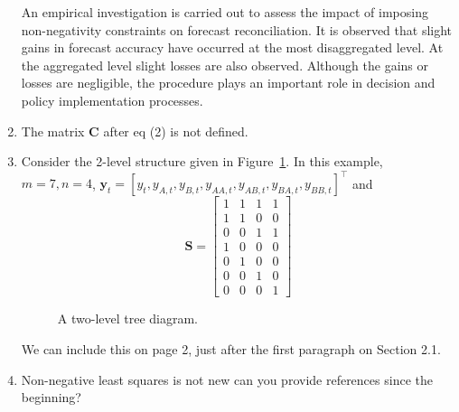 \documentclass[10pt,a4paper]{article}
\begin{document}
\begin{enumerate}
{	An empirical investigation is carried out to assess the impact of imposing non-negativity constraints on forecast reconciliation. It is observed that slight gains in forecast accuracy have occurred at the most disaggregated level. At the aggregated level slight losses are also observed. Although the gains or losses are negligible, the procedure plays an important role in decision and policy implementation processes.}
\item The matrix $\bm{C}$ after eq (2) is not defined.
\item [] Consider the 2-level structure given in Figure~\ref{fig:hier2}. In this example, $m = 7, n = 4$, $\bm{y}_t = \left[y_t, y_{A, t}, y_{B, t}, y_{AA, t}, y_{AB, t}, y_{BA, t}, y_{BB, t}\right]^\top$ and 
$$\bm{S} = \begin{bmatrix}
1 & 1 & 1 & 1\\
1 & 1 & 0 & 0\\
0 & 0 & 1 & 1\\
1 & 0 & 0 & 0\\
0 & 1 & 0 & 0\\
0 & 0 & 1 & 0\\
0 & 0 & 0 & 1
\end{bmatrix}$$  
\begin{figure}[!htb]  \center 
	\caption{A two-level tree diagram.}
	\label{fig:hier2}
\end{figure}

{\color{red} We can include this on page 2, just after the first paragraph on Section 2.1.}

\item Non-negative least squares is not new can you provide references since the beginning?


\end{enumerate}
\end{document}
